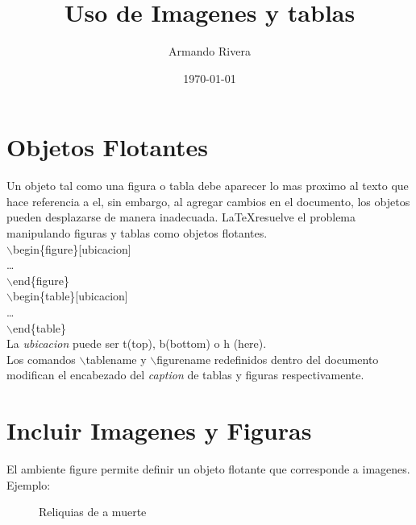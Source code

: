 \documentclass{article}
\title{Uso de Imagenes y tablas}
\author{Armando Rivera}
\date{\today}
\begin{document}
	\maketitle
	\renewcommand{\contentsname}{Tabla de contenido} %
	\renewcommand{\listfigurename}{Lista de Figuras}
	\renewcommand{\figurename}{Fig.}	%
	\renewcommand{\tablename}{Tabla}
	
	\renewcommand{\listtablename}{Lista de Tablas}
	\tableofcontents	%
	\listoffigures		%
	\listoftables
	
	\section{Objetos Flotantes}
	Un objeto tal como una figura o tabla debe aparecer lo mas proximo al texto que hace referencia a el, sin embargo, al agregar cambios en el documento, los objetos pueden desplazarse de manera inadecuada. \LaTeX resuelve el problema manipulando figuras y tablas como objetos flotantes.
	\\\textcolor{myGreen}{$\backslash$begin}\{figure\}[ubicacion]\\\dots\\\textcolor{myGreen}{$\backslash$end}\{figure\}\\\textcolor{myGreen}{$\backslash$begin}\{table\}[ubicacion]\\\dots\\\textcolor{myGreen}{$\backslash$end}\{table\}\\La \textit{ubicacion} puede ser \textcolor{myGreen}{t}(top), \textcolor{myGreen}{b}(bottom) o \textcolor{myGreen}{h} (here).\\Los comandos \textcolor{myGreen}{$\backslash$tablename} y \textcolor{myGreen}{$\backslash$figurename} redefinidos dentro del documento modifican el encabezado del \textit{caption} de tablas y figuras respectivamente.
	\section{Incluir Imagenes y Figuras}
	El ambiente \textcolor{myGreen}{figure} permite definir un objeto flotante que corresponde a imagenes. Ejemplo:\\
	\begin{figure}[ht]
		\centering
		\caption{Reliquias de a muerte}
	\end{figure}
\end{document}
